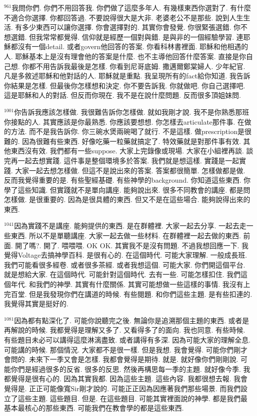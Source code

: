 \documentclass{book}
\begin{document}
$^{961}$我問你們.
你們不用回答我.
你們做了這麼多年人.
有幾樣東西你選對了.
有什麼不適合你選擇.
你都回答過.
不要說得很大是大非.
老婆老公不是那些.
說到人生生活.
有多少東西可以讓你選擇.
你會選擇對的.
其實你會發覺.
你很緊張選錯.
你不想選錯.
但我常常都覺得.
信仰就是經歷一個對與錯.
是與非的一個經驗學習.
連耶穌都沒有一個detail.
或者govern他回答的答案.
你看科林書裡面.
耶穌和他相遇的人.
耶穌基本上是沒有理會他的答案是什麼.
也不主導他回答什麼答案.
直接是你自己想.
你都不用告訴我最後是怎樣.
你看到尼哥底姆.
撒邁爾鄭棠婦人.
少年紀官.
凡是多敘述耶穌和他對話的人.
耶穌就是重點.
我呈現所有的fact給你知道.
我告訴你結果是怎樣.
但最後你怎樣想和決定.
你不要告訴我.
你就做吧.
你自己選擇吧.
這是耶穌和人的對話.
但反而你現在.
我不是在說什麼問題.
反而很多頂姐妹問.

$^{1001}$你告訴我應該怎樣做.
我很難告訴你怎樣做.
就如我剛才說.
我不是你熟悉那班你接點的人.
其實應該是你最熟悉.
你應該要想想.
你怎樣去articulate那件事.
在做的方法.
而不是我告訴你.
你三碗水煲兩碗喝了就行.
不是這樣.
做prescription是很難的.
因為很難有些東西.
好像吃藥一粒藥就搞定了.
特效藥就是對那件事有效.
其他東西沒有效.
我們都有一些suppose.
大家上完錄像或現場.
大家在小組裡再談.
談完再一起去想實踐.
這件事是整個環境多於答案.
我們就是想這樣.
實踐是一起實踐.
大家一起去想怎樣做.
但這不是說出來的答案.
答案都很簡單.
怎樣做都是做.
反而我覺得重要的是.
有些聖經基礎.
有些神學的background.
你知道這些東西.
你學了這些知識.
但實踐就不是單向講座.
能夠說出來.
很多不同教會的講座.
都是問怎樣做.
是很重要的.
因為是很具體的東西.
但又不是在這些場合.
能夠說得出來的東西.

$^{1041}$因為實踐不是講座.
能夠提供的東西.
是在群體裡.
大家一起去分享.
一起去走一些東西.
所以不是單聽講座.
大家一起去做一些材料.
在群體裡一起去做的東西.
前面.
開了嗎?.
開了.
喂喂喂.
OK OK.
其實我不是沒有問題.
不過我想回應一下.
我覺得Voltage去搞神學百科.
是很有心的.
在這個時代.
可能大家理解.
一般成長班.
我們可能看很多經卷.
或者很多茶經.
或者我想這個.
可能大家.
你們開這個平台.
就是想給大家.
在這個時代.
可能針對這個時代.
去有一些.
可能怎樣扣住.
我們這個年代.
和我們的神學.
其實有什麼關係.
其實可能想做一些這樣的事情.
我沒有上完百堂.
但是我發現你們在講道的時候.
有些閱題.
和你們這些主題.
是有些扣連的.
我覺得其實是挺好的.

$^{1081}$因為都有點深化了.
可能你說聽完之後.
無論你是追溯那個主題的東西.
或者是再解說的時候.
我都覺得是理解又多了.
又看得多了的面向.
我也同意.
有些時候.
有些題目未必可以講得這麼淋漓盡致.
或者講得有多深.
因為可能大家的理解全息.
可能講的時候.
那個情況.
大家都不是很一樣.
但是我想.
我會覺得.
可能你們剛才會問的.
未來下一季又會是怎樣.
我都會覺得是期待.
就是.
就好像你們剛剛說.
可能你們是經過很多的反省.
很多的反思.
然後再構思每一季的主題.
就好像今季.
我都覺得是很有心的.
因為其實我都.
因為這些主題.
這些內容.
我都很想去報.
我會覺得是.
正正可能像寬Sir剛才說的.
可能正正因為因應著我們那些場景.
而我們設立了這些主題.
這些題目.
但是.
在這些題目.
可能其實裡面說的神學.
都是我們最基本最核心的那些東西.
可能我們在教會學的都是這些東西.
\end{document}
